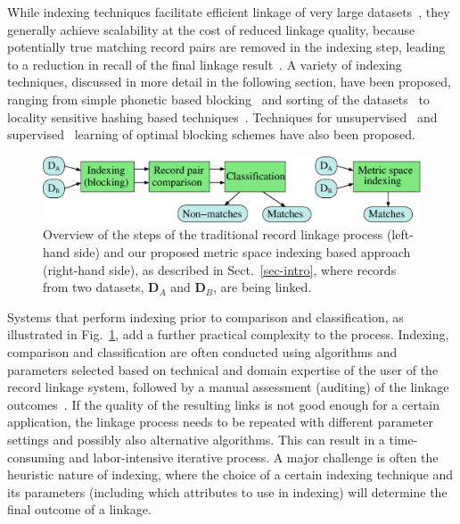 \documentclass{llncs}
\begin{document}
While indexing techniques facilitate efficient linkage of very large
datasets~\cite{Don15}, they generally achieve scalability at the cost
of reduced linkage quality, because potentially true matching record
pairs are removed in the indexing step, leading to a reduction in recall
of the final linkage result~\cite{Chr12}. A variety of indexing
techniques, discussed in more detail in the following section, have
been proposed, ranging from simple phonetic based blocking~\cite{Chr12}
and sorting of the datasets~\cite{Dra12} to locality sensitive hashing
based techniques~\cite{Kim10,Steorts2014}. Techniques for
unsupervised~\cite{Kej13,Ram15} and supervised~\cite{Bil06,Mic06}
learning of optimal blocking schemes have also been proposed.

\begin{figure}[!t]
  \centering
  \includegraphics[width=1.0\textwidth]{figures/linkage-process}
  \caption{Overview of the steps of the traditional record linkage
           process (left-hand side) and our proposed metric space
           indexing based approach (right-hand side), as described in
           Sect.~\ref{sec-intro}, where records from two datasets,
           $\mathbf{D}_A$ and $\mathbf{D}_B$, are being linked.}
           \label{fig-rl-process}
\end{figure}

Systems that perform indexing prior to comparison and classification, as
illustrated in Fig.~\ref{fig-rl-process}, add a further practical
complexity to the process. Indexing, comparison and classification are
often conducted using algorithms and parameters selected based on
technical and domain expertise of the user of the record linkage system,
followed by a manual assessment (auditing) of the linkage
outcomes~\cite{Chr12}. If the quality of the resulting links is not good
enough for a certain application, the linkage process needs to be
repeated with different parameter settings and possibly also alternative
algorithms. This can result in a time-consuming and labor-intensive
iterative process. A major challenge is often the heuristic nature of
indexing, where the choice of a certain indexing technique and its
parameters (including which attributes to use in indexing) will
determine the final outcome of a linkage.
\end{document}
